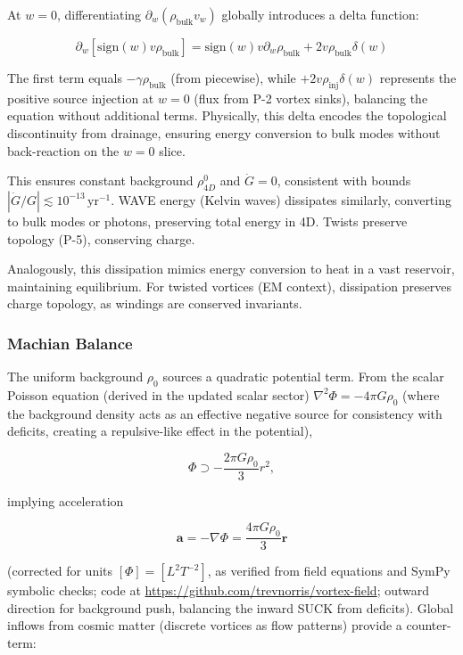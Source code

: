 At $w=0$, differentiating $\partial_w (\rho_{\text{bulk}} v_w)$ globally introduces a delta function:

\begin{equation}
\partial_w [\text{sign}(w) v \rho_{\text{bulk}}] = \text{sign}(w) v \partial_w \rho_{\text{bulk}} + 2 v \rho_{\text{bulk}} \delta(w)    
\end{equation}

The first term equals $-\gamma \rho_{\text{bulk}}$ (from piecewise), while $+2 v \rho_{\text{inj}} \delta(w)$ represents the positive source injection at $w=0$ (flux from P-2 vortex sinks), balancing the equation without additional terms. Physically, this delta encodes the topological discontinuity from drainage, ensuring energy conversion to bulk modes without back-reaction on the $w=0$ slice.

This ensures constant background $\rho_{4D}^0$ and $\dot{G} = 0$, consistent with bounds $|\dot{G}/G| \lesssim 10^{-13} \, \mathrm{yr}^{-1}$. WAVE energy (Kelvin waves) dissipates similarly, converting to bulk modes or photons, preserving total energy in 4D. Twists preserve topology (P-5), conserving charge.

Analogously, this dissipation mimics energy conversion to heat in a vast reservoir, maintaining equilibrium. For twisted vortices (EM context), dissipation preserves charge topology, as windings are conserved invariants.

\subsubsection{Machian Balance}
The uniform background $\rho_0$ sources a quadratic potential term. From the scalar Poisson equation (derived in the updated scalar sector) $\nabla^2 \Phi = -4\pi G \rho_0$ (where the background density acts as an effective negative source for consistency with deficits, creating a repulsive-like effect in the potential),

\begin{equation}
\Phi \supset -\frac{2\pi G \rho_0}{3} r^2,
\end{equation}

implying acceleration

\begin{equation}
\mathbf{a} = -\nabla \Phi = \frac{4\pi G \rho_0}{3} \mathbf{r}
\end{equation}

(corrected for units $[\Phi] = [L^2 T^{-2}]$, as verified from field equations and SymPy symbolic checks; code at \url{https://github.com/trevnorris/vortex-field}; outward direction for background push, balancing the inward SUCK from deficits). Global inflows from cosmic matter (discrete vortices as flow patterns) provide a counter-term:

